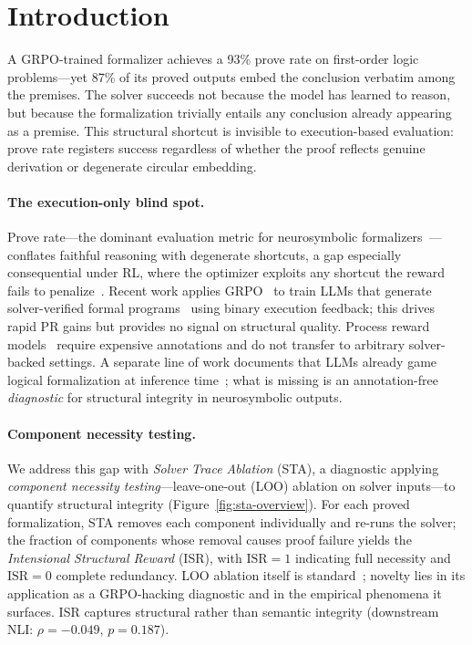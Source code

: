 \section{Introduction}
\label{sec:introduction}

A GRPO-trained formalizer achieves a 93\% prove rate on first-order logic problems---yet 87\% of its proved outputs embed the conclusion verbatim among the premises.
The solver succeeds not because the model has learned to reason, but because the formalization trivially entails any conclusion already appearing as a premise.
This structural shortcut is invisible to execution-based evaluation: prove rate registers success regardless of whether the proof reflects genuine derivation or degenerate circular embedding.

\paragraph{The execution-only blind spot.}
Prove rate---the dominant evaluation metric for neurosymbolic formalizers~\citep{logic-lm, linc, satlm}---conflates faithful reasoning with degenerate shortcuts, a gap especially consequential under RL, where the optimizer exploits any shortcut the reward fails to penalize~\citep{skalse-reward-hacking, reward-hacking-survey}.
Recent work applies GRPO~\citep{deepseekmath} to train LLMs that generate solver-verified formal programs~\citep{mellgren-prolog-grpo, logic-rl} using binary execution feedback; this drives rapid PR gains but provides no signal on structural quality.
Process reward models~\citep{lightman-verify-step, math-shepherd} require expensive annotations and do not transfer to arbitrary solver-backed settings.
A separate line of work documents that LLMs already game logical formalization at inference time~\citep{kim-game-formalization, bondarenko-spec-gaming}; what is missing is an annotation-free \emph{diagnostic} for structural integrity in neurosymbolic outputs.

\paragraph{Component necessity testing.}
We address this gap with \emph{Solver Trace Ablation} (STA), a diagnostic applying \emph{component necessity testing}---leave-one-out (LOO) ablation on solver inputs---to quantify structural integrity (Figure~\ref{fig:sta-overview}).
For each proved formalization, STA removes each component individually and re-runs the solver; the fraction of components whose removal causes proof failure yields the \emph{Intensional Structural Reward} (ISR), with $\text{ISR}{=}1$ indicating full necessity and $\text{ISR}{=}0$ complete redundancy.
LOO ablation itself is standard~\citep{demillo1978, jia-harman-survey}; novelty lies in its application as a GRPO-hacking diagnostic and in the empirical phenomena it surfaces.
ISR captures structural rather than semantic integrity (downstream NLI: $\rho{=}{-}0.049$, $p{=}0.187$).

